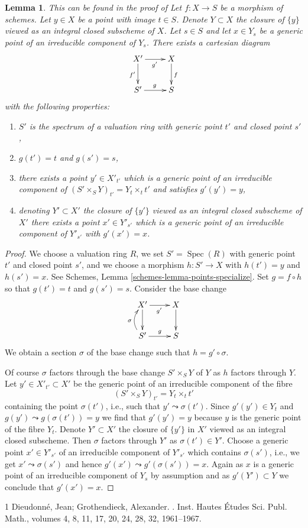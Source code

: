 \documentclass[10pt,a4paper]{amsart}
\theoremstyle{plain}
\newtheorem{lemma}[subsection]{Lemma}
\theoremstyle{definition}
\theoremstyle{remark}
\numberwithin{equation}{subsection}
\def\Spec{\mathop{\mathrm{Spec}}}
\newenvironment{reference}{}{}
\begin{document}
\begin{lemma}
\label{lemma-make-base-change}
\begin{reference}
This can be found in the proof of
\cite[IV Proposition 12.1.1.5]{EGA}
\end{reference}
Let $f : X \to S$ be a morphism of schemes. Let $y \in X$ be a point
with image $t \in S$. Denote $Y \subset X$ the closure of $\{y\}$
viewed as an integral closed subscheme of $X$. Let $s \in S$ and let
$x \in Y_s$ be a generic point of an irreducible component of $Y_s$.
There exists a cartesian diagram
$$
\xymatrix{
X' \ar[r]_{g'} \ar[d]_{f'} & X \ar[d]^f \\
S' \ar[r]^g & S
}
$$
with the following properties:
\begin{enumerate}
\item $S'$ is the spectrum of a valuation ring
with generic point $t'$ and closed point $s'$,
\item $g(t') = t$ and $g(s') = s$,
\item there exists a point $y' \in X'_{t'}$ which is
a generic point of an irreducible component of
$(S' \times_S Y)_{t'} = Y_t \times_t t'$
and satisfies $g'(y') = y$,
\item denoting $Y' \subset X'$ the closure of $\{y'\}$
viewed as an integral closed subscheme of $X'$
there exists a point $x' \in Y'_{s'}$ which is a generic
point of an irreducible component of $Y'_{s'}$
with $g'(x') = x$.
\end{enumerate}
\end{lemma}

\begin{proof}
We choose a valuation ring $R$, we set $S' = \Spec(R)$ with
generic point $t'$ and closed point $s'$, and we choose a morphism
$h : S' \to X$ with $h(t') = y$ and $h(s') = x$.
See Schemes, Lemma \ref{schemes-lemma-points-specialize}.
Set $g = f \circ h$ so that $g(t') = t$ and $g(s') = s$.
Consider the base change
$$
\xymatrix{
X' \ar[r]_{g'} \ar[d] & X \ar[d] \\
S' \ar@/^1em/[u]^\sigma \ar[r]^-g & S
}
$$
We obtain a section $\sigma$ of the base change such that
$h = g' \circ \sigma$.

\medskip\noindent
Of course $\sigma$ factors through the base change $S' \times_S Y$ of $Y$
as $h$ factors through $Y$. Let $y' \in X'_{t'} \subset X'$ be the
generic point of an irreducible component of the fibre
$$
(S' \times_S Y)_{t'} = Y_t \times_t t'
$$
containing the point $\sigma(t')$, i.e., such that
$y' \leadsto \sigma(t')$.
Since $g'(y') \in Y_t$ and $g(y') \leadsto g(\sigma(t')) = y$
we find that $g'(y') = y$ because $y$ is the generic point of
the fibre $Y_t$.
Denote $Y' \subset X'$ the closure of $\{y'\}$ in $X'$ viewed
as an integral closed subscheme.
Then $\sigma$ factors through $Y'$ as $\sigma(t') \in Y'$.
Choose a generic point $x' \in Y'_{s'}$ of an irreducible
component of $Y'_{s'}$ which contains $\sigma(s')$, i.e., we
get $x' \leadsto \sigma(s')$ and hence $g'(x') \leadsto g'(\sigma(s')) = x$.
Again as $x$ is a generic point of an irreducible component of $Y_s$
by assumption
and as $g'(Y') \subset Y$ we conclude that $g'(x') = x$.
\end{proof}

\begin{thebibliography}{1}
Dieudonn\'{e}, Jean; Grothendieck, Alexander.
.
\newblock Inst. Hautes \'Etudes Sci. Publ. Math., volumes 4, 8, 11, 17, 20, 24, 28, 32, 1961--1967.
\end{thebibliography}
\end{document}
